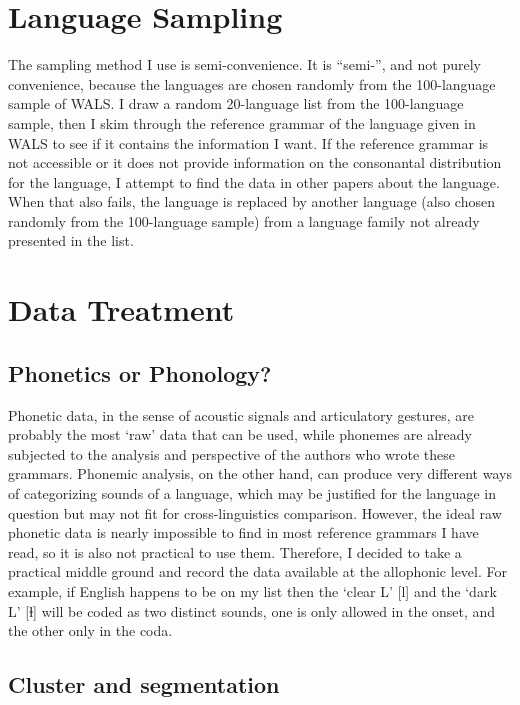 \section{Language Sampling}

The sampling method I use is semi-convenience. It is ``semi-'', and not purely convenience, because the languages are chosen randomly from the 100-language sample of WALS. 
I draw a random 20-language list from the 100-language sample, then I skim through the reference grammar of the language given in WALS to see if it contains the information I want. 
If the reference grammar is not accessible or it does not provide information on the consonantal distribution for the language, I attempt to find the data in other papers about the language. 
When that also fails, the language is replaced by another language (also chosen randomly from the 100-language sample) from a language family not already presented in the list.

\section{Data Treatment}

\subsection{Phonetics or Phonology?}

Phonetic data, in the sense of acoustic signals and articulatory gestures, are probably the most `raw' data that can be used, while phonemes are already subjected to the analysis and perspective of the authors who wrote these grammars. 
Phonemic analysis, on the other hand, can produce very different ways of categorizing sounds of a language, which may be justified for the language in question but may not fit for cross-linguistics comparison. 
However, the ideal raw phonetic data is nearly impossible to find in most reference grammars I have read, so it is also not practical to use them.
Therefore, I decided to take a practical middle ground and record the data available at the allophonic level. For example, if English happens to be on my list then the `clear L' [l] and the `dark L' [ɫ] will be coded as two distinct sounds, one is only allowed in the onset, and the other only in the coda. 

\subsection{Cluster and segmentation}

